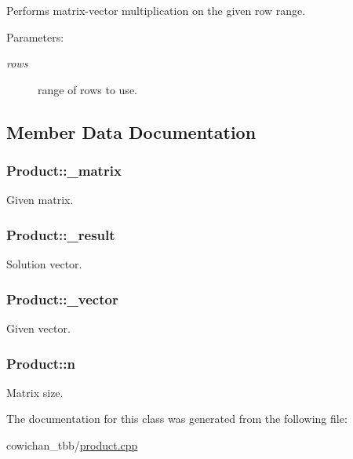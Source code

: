 Performs matrix-vector multiplication on the given row range. \begin{Desc}
\item[Parameters:]
\begin{description}
\item[{\em rows}]range of rows to use. \end{description}
\end{Desc}


\subsection{Member Data Documentation}
\hypertarget{class_product_63011ee94f2a8c0aa49468c1a8029478}{
\subsubsection[{\_\-matrix}]{ {\bf Product::\_\-matrix}}}
\label{class_product_63011ee94f2a8c0aa49468c1a8029478}


Given matrix. \hypertarget{class_product_81890b0d05e574d9dc8dae60a9815e32}{
\subsubsection[{\_\-result}]{ {\bf Product::\_\-result}}}
\label{class_product_81890b0d05e574d9dc8dae60a9815e32}


Solution vector. \hypertarget{class_product_40c40247c21e89bce81a64001c52caab}{
\subsubsection[{\_\-vector}]{ {\bf Product::\_\-vector}}}
\label{class_product_40c40247c21e89bce81a64001c52caab}


Given vector. \hypertarget{class_product_7216f072885841c00e8e4aa3372ea277}{
\subsubsection[{n}]{ {\bf Product::n}}}
\label{class_product_7216f072885841c00e8e4aa3372ea277}


Matrix size. 

The documentation for this class was generated from the following file:\begin{CompactItemize}
\item 
cowichan\_\-tbb/\hyperlink{cowichan__tbb_2product_8cpp}{product.cpp}\end{CompactItemize}
